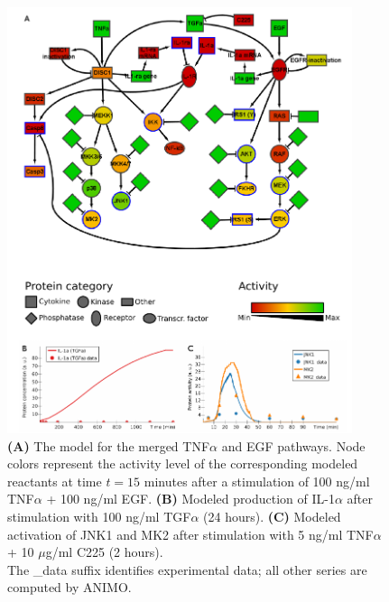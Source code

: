 \documentclass{bmcart}
\begin{document}
\def\largeModelScale{0.18}%
\def\legendScalaColori{0.21}%
\def\legendScalaForme{0.21}%
\def\scalaGrafici{0.0709}%
\begin{figure}[!htpb]
\centering
  \includegraphics[width=0.9\textwidth]{images/large_network_merged_no_hypotheses_oneImage}
\caption{
{\bf(A)} %
The model for the merged TNF$\alpha$ and EGF pathways. Node colors represent the
activity level of the corresponding modeled reactants at time $t = 15$ minutes after
a stimulation of 100 ng/ml TNF$\alpha$ + 100 ng/ml EGF.
{\bf(B)} %
Modeled production of IL-1$\alpha$ after stimulation with 100 ng/ml TGF$\alpha$ (24 hours).
{\bf(C)} %
Modeled activation of JNK1 and MK2 after stimulation with 5 ng/ml TNF$\alpha$ + 10 $\mu$g/ml C225 (2 hours).
\\
The {\sf \_{}data} suffix identifies experimental data; all other series are computed by ANIMO.}\label{fig:large-model-all}
\end{figure}
\end{document}
